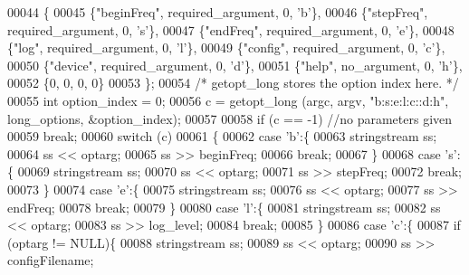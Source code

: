 \begin{DoxyCode}
00044         \{
00045             \{\textcolor{stringliteral}{"beginFreq"},   required\_argument, 0, \textcolor{charliteral}{'b'}\},
00046             \{\textcolor{stringliteral}{"stepFreq"},    required\_argument, 0, \textcolor{charliteral}{'s'}\},
00047             \{\textcolor{stringliteral}{"endFreq"},     required\_argument, 0, \textcolor{charliteral}{'e'}\},
00048             \{\textcolor{stringliteral}{"log"},         required\_argument, 0, \textcolor{charliteral}{'l'}\},
00049             \{\textcolor{stringliteral}{"config"},      required\_argument, 0, \textcolor{charliteral}{'c'}\},
00050             \{\textcolor{stringliteral}{"device"},      required\_argument, 0, \textcolor{charliteral}{'d'}\},
00051             \{\textcolor{stringliteral}{"help"},        no\_argument, 0, \textcolor{charliteral}{'h'}\},
00052             \{0, 0, 0, 0\}
00053         \};
00054         \textcolor{comment}{/* getopt\_long stores the option index here. */}
00055         \textcolor{keywordtype}{int} option\_index = 0;
00056         c = getopt\_long (argc, argv, \textcolor{stringliteral}{"b:s:e:l:c::d:h"}, long\_options, &option\_index);
00057 
00058         \textcolor{keywordflow}{if} (c == -1) \textcolor{comment}{//no parameters given}
00059             \textcolor{keywordflow}{break};
00060         \textcolor{keywordflow}{switch} (c)
00061         \{
00062         \textcolor{keywordflow}{case} \textcolor{charliteral}{'b'}:\{
00063             stringstream ss;
00064             ss << optarg;
00065             ss >> beginFreq;
00066             \textcolor{keywordflow}{break};
00067         \}
00068         \textcolor{keywordflow}{case} \textcolor{charliteral}{'s'}:\{
00069             stringstream ss;
00070             ss << optarg;
00071             ss >> stepFreq;
00072             \textcolor{keywordflow}{break};
00073         \}
00074         \textcolor{keywordflow}{case} \textcolor{charliteral}{'e'}:\{
00075             stringstream ss;
00076             ss << optarg;
00077             ss >> endFreq;
00078             \textcolor{keywordflow}{break};
00079         \}
00080         \textcolor{keywordflow}{case} \textcolor{charliteral}{'l'}:\{
00081             stringstream ss;
00082             ss << optarg;
00083             ss >> log_level;
00084             \textcolor{keywordflow}{break};
00085         \}
00086         \textcolor{keywordflow}{case} \textcolor{charliteral}{'c'}:\{
00087             \textcolor{keywordflow}{if} (optarg != NULL)\{
00088                 stringstream ss;
00089                 ss << optarg;
00090                 ss >> configFilename;

\end{DoxyCode}
